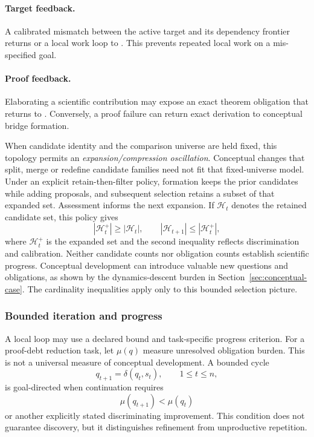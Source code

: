 \paragraph{Target feedback.}
A calibrated mismatch between the active target and its dependency frontier
returns  or a local work loop to
. This prevents repeated local work on a
mis-specified goal.

\paragraph{Proof feedback.}
Elaborating a scientific contribution may expose an exact theorem obligation
that returns  to
. Conversely, a proof failure can return exact
derivation to conceptual bridge formation.

When candidate identity and the comparison universe are held fixed, this
topology permits an \emph{expansion/compression oscillation}. Conceptual changes
that split, merge or redefine candidate families need not fit that fixed-universe
model. Under an explicit retain-then-filter policy, formation keeps the prior
candidates while adding proposals, and subsequent selection retains a subset of
that expanded set. Assessment informs the next expansion. If $\mathcal{H}_t$
denotes the retained candidate set, this policy gives
\[
  |\mathcal{H}_{t}^{+}|\geq|\mathcal{H}_{t}|,
  \qquad
  |\mathcal{H}_{t+1}|\leq|\mathcal{H}_{t}^{+}|,
\]
where $\mathcal{H}_{t}^{+}$ is the expanded set and the second inequality
reflects discrimination and calibration. Neither candidate counts nor obligation counts establish scientific progress.
Conceptual development can introduce valuable new questions and obligations, as
shown by the dynamics-descent burden in Section~\ref{sec:conceptual-case}. The
cardinality inequalities apply only to this bounded selection picture.

\subsubsection{Bounded iteration and progress}

A local loop may use a declared bound and task-specific progress criterion.
For a proof-debt reduction task, let $\mu(q)$ measure unresolved obligation burden.
This is not a universal measure of conceptual development. A bounded cycle
\[
  q_{t+1}=\delta(q_t,s_t),\qquad 1\leq t\leq n,
\]
is goal-directed when continuation requires
\[
  \mu(q_{t+1})<\mu(q_t)
\]
or another explicitly stated discriminating improvement. This condition does
not guarantee discovery, but it distinguishes refinement from unproductive
repetition.

